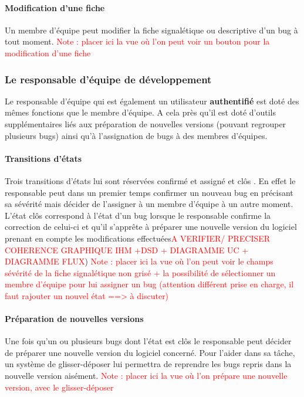 \documentclass{article}[12pt]
\begin{document}
 \paragraph{Modification d'une fiche}
 Un membre d'équipe peut modifier la fiche signalétique ou descriptive d'un bug à tout moment.
  \textcolor{red}{Note : placer ici la vue où l'on peut voir un bouton pour la modification d'une fiche}
 
\subsubsection{Le responsable d'équipe de développement}
Le responsable d'équipe qui est également un utilisateur \textbf{authentifié} est doté des mêmes fonctions que le membre d'équipe. A cela près qu'il est doté d'outils supplémentaires liés aux préparation de nouvelles versions (pouvant regrouper plusieurs bugs) ainsi qu'à l'assignation de bugs à des membres d'équipes. 

\paragraph{Transitions d'états}
Trois transitions d'états lui sont réservées \og confirmé \fg et \og assigné \fg et \og clôs \fg . En effet le responsable peut dans un premier temps confirmer un nouveau bug en précisant sa sévérité mais décider de l'assigner à un membre d'équipe à un autre moment. L'état \og clôs \fg correspond à l'état d'un bug lorsque le responsable confirme la correction de celui-ci et qu'il s'apprête à préparer une nouvelle version du logiciel prenant en compte les modifications effectuées\textcolor{red}{A VERIFIER/ PRECISER COHERENCE GRAPHIQUE IHM +DSD + DIAGRAMME UC + DIAGRAMME FLUX})
  \textcolor{red}{Note : placer ici la vue où l'on peut voir le champs sévérité de la fiche signalétique non grisé + la possibilité de sélectionner un membre d'équipe pour lui assigner un bug (attention différent prise en charge, il faut rajouter un nouvel état ==> à discuter)}
\paragraph{Préparation de nouvelles versions}
Une fois qu'un ou plusieurs bugs dont l'état est \og clôs \fg le responsable peut décider de préparer une nouvelle version du logiciel concerné. Pour l'aider dans sa tâche, un  système de glisser-déposer lui permettra de reprendre les bugs repris dans la nouvelle version aisément.
  \textcolor{red}{Note : placer ici la vue où l'on prépare une nouvelle version, avec le glisser-déposer}
\end{document}
